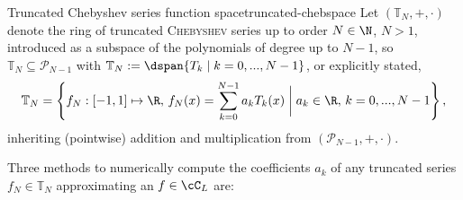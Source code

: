 \documentclass[12pt, a4paper]{article}
\newcommand{\chebyshev}{\textsc{Chebyshev}\xspace}
\begin{document}
  \begin{definition}{Truncated Chebyshev series function space}{truncated-chebspace}
    Let $(\mathbb{T}_N, +, \cdot)$ denote the ring of truncated \chebyshev series up to order $N \in \N$, $N > 1$, introduced as a subspace of the polynomials of degree up to $N-1$, so $\mathbb{T}_N \subseteq \mathcal{P}_{N-1}$ with $\mathbb{T}_N := \dspan\{T_k \;|\; k = 0, ..., N-1\}$, or explicitly stated,
    $$\mathbb{T}_N = \left\{f_N: [-1, 1] \mapsto \R,\, f_N(x) = \sum_{k=0}^{N-1} a_k T_k(x) \;\bigg|\; a_k \in \R,\, k = 0, ..., N-1\right\},$$
    inheriting (pointwise) addition and multiplication from $(\mathcal{P}_{N-1}, +, \cdot)$.
  \end{definition}

  Three methods to numerically compute the coefficients $a_k$ of any truncated series $f_N \in \mathbb{T}_N$ approximating an $f \in \cC_L$ are:
\end{document}
